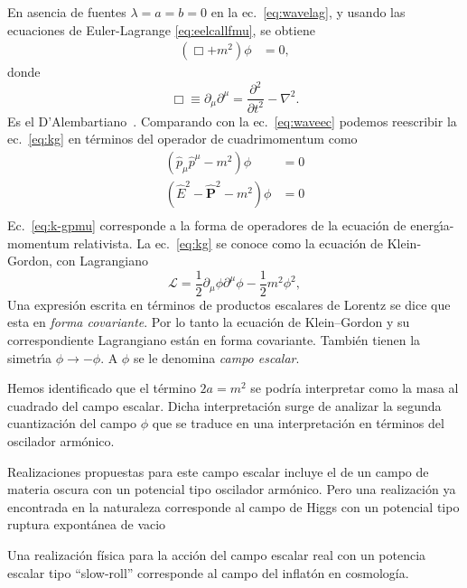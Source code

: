 En asencia de fuentes $\lambda=a=b=0$ en la ec.~\eqref{eq:wavelag}, y usando las
ecuaciones de Euler-Lagrange \eqref{eq:eelcallfmu}, se obtiene
\begin{align}
  \label{eq:kg} 
  (\Box+m^2)\phi&=0,
\end{align}
donde
\begin{equation}
  \label{eq:dalambertiano}
  \Box\equiv\partial_\mu\partial^\mu=\frac{\partial^2}{\partial t^2}-\nabla^2. 
\end{equation}
Es el D'Alembartiano~\cite{daelembertiano}.
Comparando con la ec.~\eqref{eq:waveec} podemos reescribir la ec.~\eqref{eq:kg} en términos del operador de cuadrimomentum como
\begin{align}
  (\hat{p}_\mu\hat{p}^\mu-m^2)\phi&=0\nonumber\\
  \label{eq:k-gpmu} %
(\hat{E}^2-\hat{\boldsymbol{P}}^2-m^2)\phi&=0\\
\end{align}
Ec.~\eqref{eq:k-gpmu} %
corresponde a la forma de operadores de la
ecuaci\'on de energ\'\i a-momentum relativista. La
ec.~\eqref{eq:kg} se conoce como la ecuaci\'on de Klein-Gordon, con
Lagrangiano
\begin{equation}
  \label{eq:kglag}
  \mathcal{L}=\frac{1}{2}\partial_\mu\phi\partial^\mu\phi-\frac{1}{2}m^2\phi^2, 
\end{equation}
Una expresi\'on escrita en t\'erminos de productos escalares de
Lorentz se dice que esta en \emph{forma covariante}. Por lo tanto la
ecuaci\'on de Klein--Gordon y su correspondiente Lagrangiano est\'an
en forma covariante. Tambi\'en tienen la simetr\'\i a
$\phi\to-\phi$. A $\phi$ se le denomina \emph{campo escalar}.

Hemos identificado que el término $2a=m^2$ se podría interpretar como la masa al cuadrado del campo escalar. Dicha interpretación surge de analizar la segunda cuantización del campo $\phi$ que se traduce en una interpretación en términos del oscilador armónico.

Realizaciones propuestas para este campo escalar incluye el de un campo de materia oscura con un potencial tipo oscilador armónico.
Pero una realización ya encontrada en la naturaleza corresponde al campo de Higgs con un potencial tipo ruptura expontánea de vacio

Una realización física para la acción del campo escalar real con un potencia escalar tipo ``slow-roll''  corresponde al campo del inflatón en cosmología.



